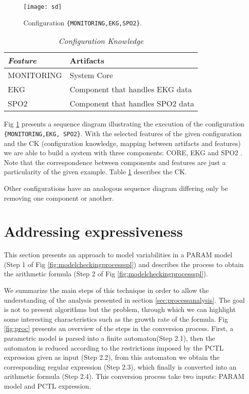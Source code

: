 \documentclass[conference]{IEEEtran}
\begin{document}
	
	\begin{figure}[!h]
	\centering
	\texttt{[image: sd]}	
	\caption{Configuration \texttt{\{MONITORING,EKG,SPO2\}}.}
	\label{fig:sd}
	\end{figure}
	
		
		\begin{table}[!hb]
	\begin{center}
	\begin{tabular}{|l|l|}
	\hline
	\textit{\textbf{Feature}} & \textbf{Artifacts} \\ \hline
	MONITORING &  System Core \\ \hline
	EKG &  Component that handles EKG data \\ \hline
	SPO2 & Component that handles SPO2 data \\ \hline
	\end{tabular}
	\end{center}
	\caption{\textit{Configuration Knowledge}}
	\label{tb:ck}
	\end{table}	
	
	Fig \ref{fig:sd} presents a sequence diagram illustrating the execution of the configuration \texttt{\{MONITORING,EKG, SPO2\}}.
	With the selected features of the given configuration and the CK (configuration knowledge, mapping between artifacts and features)
	we are able to build a system with three components: CORE, EKG and SPO2 \cite{czarnecki}. Note that the correspondence between components and features are just
	a particularity of the given example. Table \ref{tb:ck} describes the CK.
	 

	Other configurations have an analogous sequence diagram differing only be removing 
	one component or another.

	
		
\section{Addressing expressiveness}
\label{sec:parametricmodelchecking}


	This section presents an approach to model variabilities in a PARAM model (Step 1 of Fig \ref{fig:modelcheckingprocessspl})
	and describes the process to obtain the arithmetic formula (Step 2 of Fig \ref{fig:modelcheckingprocessspl}).
	
	We summarize the main steps of this technique in order to
	allow the understanding of the analysis presented in section \ref{sec:processanalysis}.	
	The goal is not to present algorithms but the problem, through which we can highlight some
	interesting characteristics such as the growth rate of the formula. Fig \ref{fig:proc} presents 
	an overview of the steps in the conversion process. First, a parametric model is parsed into
	a finite automaton(Step 2.1), then the automaton is reduced according to the restrictions imposed by the PCTL expression 
	given as input (Step 2.2), from this automaton we obtain the corresponding regular expression (Step 2.3),
	which finally is converted into an arithmetic formula (Step 2.4). This conversion process take two inputs:
	PARAM model and PCTL expression.	
\end{document}
